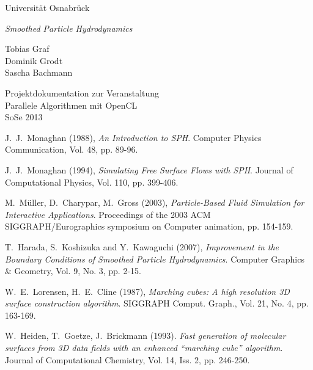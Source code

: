 \documentclass[a4paper,12pt,oneside]{amsbook}
\begin{document}
\begin{titlepage}
\begin{center}
{\large Universität Osnabrück}


\vspace{9em}
{\LARGE \emph{Smoothed Particle Hydrodynamics}}

\vspace{2em}
{\large Tobias Graf\\ Dominik Grodt\\ Sascha Bachmann}

\vspace{9em}
{\large Projektdokumentation zur Veranstaltung\\ Parallele Algorithmen mit OpenCL\\ SoSe 2013}



\end{center}
\end{titlepage}

\tableofcontents










\begin{thebibliography}{}


J.\ J.\ Monaghan (1988),
{\em An Introduction to SPH}. Computer Physics Communication, Vol. 48, pp. 89-96.


J.\ J.\ Monaghan (1994),
{\em Simulating Free Surface Flows with SPH}. Journal of Computational Physics, Vol. 110, pp. 399-406.


M.\ Müller, D.\ Charypar, M.\ Gross (2003),
{\em Particle-Based Fluid Simulation for Interactive Applications}. Proceedings of the 2003 ACM SIGGRAPH/Eurographics symposium on Computer animation, pp. 154-159.


T.\ Harada, S.\ Koshizuka and Y.\ Kawaguchi (2007),
{\em Improvement in the Boundary Conditions of Smoothed Particle Hydrodynamics}. Computer Graphics \& Geometry, Vol. 9, No. 3, pp. 2-15.


W.\ E.\ Lorensen, H.\ E.\ Cline (1987),
{\em Marching cubes: A high resolution 3D surface construction algorithm}. SIGGRAPH Comput. Graph., Vol. 21, No. 4, pp. 163-169.


W.\ Heiden, T.\ Goetze, J.\ Brickmann (1993). {\em Fast generation of molecular surfaces from 3D data fields with an enhanced ``marching cube'' algorithm}. Journal of Computational Chemistry, Vol. 14, Iss. 2, pp. 246-250.

\end{thebibliography}
\end{document}
